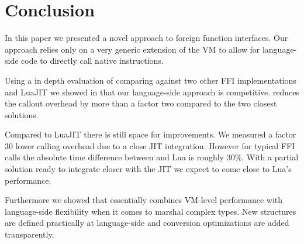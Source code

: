 \section{Conclusion}
In this paper we presented \NB a novel approach to foreign function interfaces.
Our approach relies only on a very generic extension of the VM to allow for language-side code to directly call native instructions.

Using a in depth evaluation of \NB comparing against two other \ST FFI implementations and LuaJIT we showed in  that our language-side approach is competitive.
\NB reduces the callout overhead by more than a factor two compared to the two closest \ST solutions.

Compared to LuaJIT there is still space for improvements.
We measured a factor 30 lower calling overhead due to a close JIT integration.
However for typical FFI calls the absolute time difference between \NB and Lua is roughly $30\%$.
With a partial solution ready to integrate \NB closer with the JIT we expect to come close to Lua's performance.

Furthermore we showed that \NB essentially combines VM-level performance with language-side flexibility when it comes to marshal complex types.
New structures are defined practically at language-side and conversion optimizations are added transparently.


